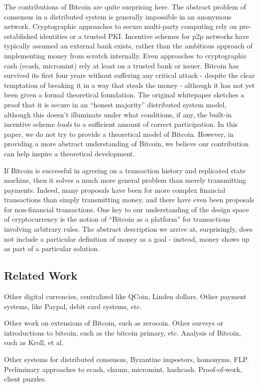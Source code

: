 The contributions of Bitcoin are quite surprising here. The abstract problem of consensus in a distributed system is generally impossible in an anonymous network. Cryptographic approaches to secure multi-party computing rely on pre-established identities or a trusted PKI. Incentive schemes for p2p networks have typically assumed an external bank exists, rather than the ambitious approach of implementing money from scratch internally. Even approaches to cryptographic cash (ecash, micromint) rely at least on a trusted bank or issuer. Bitcoin has survived its first four years without suffering any critical attack - despite the clear temptation of breaking it in a way that steals the money - although it has not yet been given a formal theoretical foundation. The original whitepaper sketches a proof that it is secure in an ``honest majority'' distributed system model, although this doesn't illuminate under what conditions, if any, the built-in incentive scheme {\em leads} to a sufficient amount of correct participation. In this paper, we do not try to provide a theoretical model of Bitcoin. However, in providing a more abstract understanding of Bitcoin, we believe our contribution can help inspire a theoretical development. 

If Bitcoin is successful in agreeing on a transaction history and replicated state machine, then it solves a much more general problem than merely transmitting payments. Indeed, many proposals have been for more complex financial transactions than simply transmitting money, and there have even been proposals for non-financial transactions. One key to our understanding of the design space of cryptocurrency is the notion of ``Bitcoin as a platform'' for transactions involving arbitrary rules. The abstract description we arrive at, surprisingly, does not include a particular definition of money as a goal - instead, money shows up as part of a particular solution. 



\subsection{Related Work}

Other digital currencies, centralized like QCoin, Linden dollars. Other payment systems, like Paypal, debit card systems, etc.

Other work on extensions of Bitcoin, such as zerocoin. Other surveys or introductions to bitcoin, such as the bitcoin primary, etc. Analysis of Bitcoin, such as Kroll, et al.

Other systems for distributed consensus, Byzantine impostors, homonyms, FLP. Preliminary approaches to ecash, chaum, micromint, hashcash.
Proof-of-work, client puzzles.
